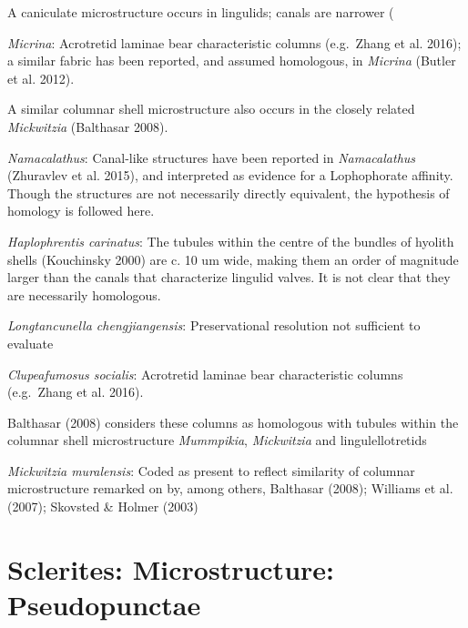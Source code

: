 \documentclass[]{book}
\theoremstyle{definition}
\theoremstyle{definition}
\theoremstyle{definition}
\theoremstyle{remark}
\begin{document}
A caniculate microstructure occurs in lingulids; canals are narrower (

\emph{Micrina}: Acrotretid laminae bear characteristic columns
(e.g.~Zhang et al. 2016); a similar fabric has been reported, and
assumed homologous, in \emph{Micrina} (Butler et al. 2012).

A similar columnar shell microstructure also occurs in the closely
related \emph{Mickwitzia} (Balthasar 2008).

\emph{Namacalathus}: Canal-like structures have been reported in
\emph{Namacalathus} (Zhuravlev et al. 2015), and interpreted as evidence
for a Lophophorate affinity. Though the structures are not necessarily
directly equivalent, the hypothesis of homology is followed here.

\emph{Haplophrentis carinatus}: The tubules within the centre of the
bundles of hyolith shells (Kouchinsky 2000) are c. 10 um wide, making
them an order of magnitude larger than the canals that characterize
lingulid valves. It is not clear that they are necessarily homologous.

\emph{Longtancunella chengjiangensis}: Preservational resolution not
sufficient to evaluate

\emph{Clupeafumosus socialis}: Acrotretid laminae bear characteristic
columns (e.g.~Zhang et al. 2016).

Balthasar (2008) considers these columns as homologous with tubules
within the columnar shell microstructure \emph{Mummpikia},
\emph{Mickwitzia} and lingulellotretids

\emph{Mickwitzia muralensis}: Coded as present to reflect similarity of
columnar microstructure remarked on by, among others, Balthasar (2008);
Williams et al. (2007); Skovsted \& Holmer (2003)

\hypertarget{sclerites-microstructure-pseudopunctae}{%
\section*{Sclerites: Microstructure:
Pseudopunctae}\label{sclerites-microstructure-pseudopunctae}}
\end{document}
